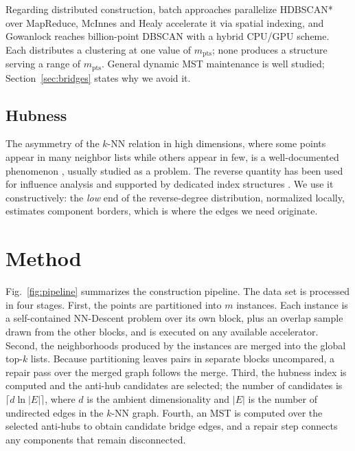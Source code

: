 \documentclass{ieeeaccess}
\newcommand{\mpts}{m_{\mathrm{pts}}}
\begin{document}
Regarding distributed construction, batch approaches
\cite{mrhdbscan} parallelize HDBSCAN* over MapReduce, McInnes and Healy
\cite{acceleratedhdbscan} accelerate it via spatial indexing, and Gowanlock
\cite{bpshdbscan} reaches billion-point DBSCAN with a hybrid CPU/GPU scheme.
Each distributes a clustering at one value of $\mpts$; none produces a
structure serving a range of $\mpts$. General dynamic MST maintenance
\cite{mst_maintenance} is well studied; Section~\ref{sec:bridges} states why
we avoid it.

\subsection{Hubness}

The asymmetry of the $k$-NN relation in high dimensions, where some points
appear in many neighbor lists while others appear in few, is a well-documented
phenomenon \cite{hubs}, usually studied as a problem. The reverse quantity has
been used for influence analysis \cite{influencesets} and supported by dedicated
index structures \cite{rdnntree}. We use it constructively: the \emph{low} end
of the reverse-degree distribution, normalized locally, estimates component
borders, which is where the edges we need originate.

\section{Method}
\label{sec:method}

Fig.~\ref{fig:pipeline} summarizes the construction pipeline. The data set is processed in four stages. First, the points are partitioned into $m$ instances. Each instance is a self-contained NN-Descent problem over its own block, plus an overlap sample drawn from the other blocks, and is executed on any available accelerator. Second, the neighborhoods produced by the instances are merged into the global top-$k$ lists. Because partitioning leaves pairs in separate blocks uncompared, a repair pass over the merged graph follows the merge. Third, the hubness index is computed and the anti-hub candidates are selected; the number of candidates is $\lceil d \ln |E| \rceil$, where $d$ is the ambient dimensionality and $|E|$ is the number of undirected edges in the $k$-NN graph. Fourth, an MST is computed over the selected anti-hubs to obtain candidate bridge edges, and a repair step connects any components that remain disconnected.
\end{document}
